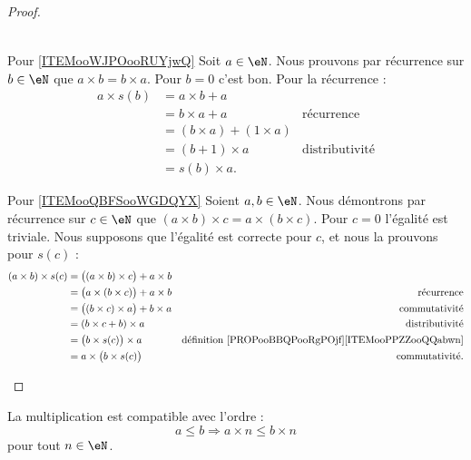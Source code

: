 \begin{proof}
\begin{subproof}
\begin{subequations}
\begin{align}
            \end{align}
        \end{subequations}
    \item[Pour \ref{ITEMooWJPOooRUYjwQ}]
        Soit \( a\in \eN\). Nous prouvons par récurrence sur \( b\in \eN\) que \( a\times b=b\times a\). Pour \( b=0\) c'est bon. Pour la récurrence :
        \begin{subequations}
            \begin{align}
                a\times s(b)&=a\times b+a\\
                &=b\times a+a   &\text{récurrence}\\
                &=(b\times a)+(1\times a)\\
                &=(b+1)\times a&\text{distributivité}\\
                &=s(b)\times a.
            \end{align}
        \end{subequations}
    \item[Pour \ref{ITEMooQBFSooWGDQYX}]
        Soient \( a,b\in \eN\). Nous démontrons par récurrence sur \( c\in \eN\) que \( (a\times b)\times c=a\times (b\times c)\). Pour \( c=0\) l'égalité est triviale. Nous supposons que l'égalité est correcte pour \( c\), et nous la prouvons pour \( s(c)\) :
        \begin{subequations}
            \begin{align}
                (a\times b)\times s(c)&=\big( (a\times b)\times c \big)+a\times b\\
                &=\big( a\times (b\times c) \big)+a\times b &\text{récurrence}\\
                &=\big( (b\times c)\times a \big)+b\times a&\text{commutativité}\\
                &=(b\times c+b)\times a&\text{distributivité}\\
                &=\big( b\times s(c) \big)\times a&\text{définition \ref{PROPooBBQPooRgPOjf}\ref{ITEMooPPZZooQQabwn}}\\
                &=a\times \big( b\times s(c) \big)&\text{commutativité}.
            \end{align}
        \end{subequations}
    \end{subproof}
\end{proof}

\begin{lemma}
    La multiplication est compatible avec l'ordre : 
    \begin{equation}
        a\leq b\Rightarrow a\times n\leq b\times n
    \end{equation}
    pour tout \( n\in \eN\).
\end{lemma}

